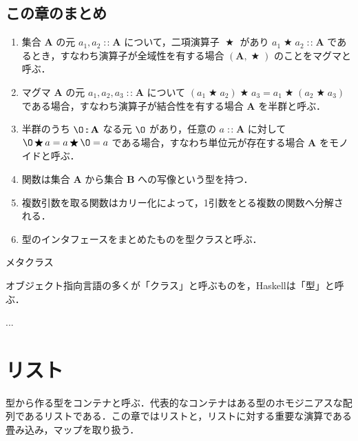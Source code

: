 \documentclass[a4paper,twocolumn]{jsbook}
\newcommand{\programminglanguage}[1]{\textsf{#1}}
\newcommand{\haskell}{\programminglanguage{Haskell}}
\newenvironment{leader}{\begingroup\gt}{\endgroup}
\newenvironment{note}[1]{\begin{boxnote}\begin{center}#1\end{center}}{\end{boxnote}}
\newcommand{\mZero}{\O}
\DeclareMathOperator{\mBinOp}{\bigstar}
\DeclareMathOperator{\mIn}{{:\!:}}
\newcommand{\mSet}[1]{\mathbf{#1}}
\newcommand{\mTupleWith}[1]{\left(#1\right)}
\begin{document}
\section{この章のまとめ}

\begin{enumerate}
\item 集合 $\mSet{A}$ の元 $a_1,a_2\mIn\mSet{A}$ について，二項演算子 $\mBinOp$ があり $a_1\mBinOp a_2\mIn\mSet{A}$ であるとき，すなわち演算子が全域性を有する場合 $\mTupleWith{\mSet{A},\mBinOp}$ のことをマグマと呼ぶ．
\item マグマ $\mSet{A}$ の元 $a_1,a_2,a_3\mIn\mSet{A}$ について $(a_1\mBinOp a_2)\mBinOp a_3=a_1\mBinOp(a_2\mBinOp a_3)$ である場合，すなわち演算子が結合性を有する場合 $\mSet{A}$ を半群と呼ぶ．
\item 半群のうち $\mZero\mIn\mSet{A}$ なる元 $\mZero$ があり，任意の $a\mIn\mSet{A}$ に対して $\mZero\mBinOp a=a\mBinOp\mZero=a$ である場合，すなわち単位元が存在する場合 $\mSet{A}$ をモノイドと呼ぶ．
\item 関数は集合 $\mSet{A}$ から集合 $\mSet{B}$ への写像という型を持つ． %
\item 複数引数を取る関数はカリー化によって，1引数をとる複数の関数へ分解される．
\item 型のインタフェースをまとめたものを型クラスと呼ぶ． %
\end{enumerate}

\begin{note}{メタクラス}
オブジェクト指向言語の多くが「クラス」と呼ぶものを，\haskell は「型」と呼ぶ．



...
\end{note}



\chapter{リスト}
\label{ch:list}

\begin{leader}
型から作る型をコンテナと呼ぶ．代表的なコンテナはある型のホモジニアスな配列であるリストである．この章ではリストと，リストに対する重要な演算である畳み込み，マップを取り扱う．
\end{leader}
\end{document}
